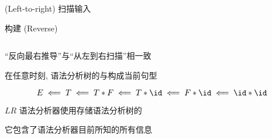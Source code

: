 \begin{frame}{}
  \begin{center}

    \vspace{0.80cm}
    \begin{columns}
        \begin{description}
          \setlength{\itemsep}{15pt}
          \item[$L:$]  (Left-to-right) 扫描输入
          \item[$R:$] 构建 (Reverse) 
        \end{description}
    \end{columns}

    \vspace{0.80cm}
    ``反向最右推导''与``从左到右扫描''相一致
  \end{center}
\end{frame}

\begin{frame}{}
  \begin{center}

    \vspace{0.80cm}
    在任意时刻, 语法分析树的与构成当前句型

    \vspace{0.60cm}
    \[
      E \impliedby T \impliedby T \ast F \impliedby T \ast \id \impliedby F \ast \id
        \impliedby \id \ast \id
    \]

    \vspace{0.60cm}
    $LR$ 语法分析器使用存储语法分析树的

    \vspace{0.30cm}
    它包含了语法分析器目前所知的所有信息
  \end{center}
\end{frame}

